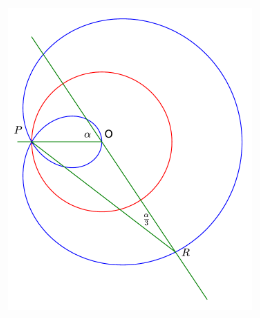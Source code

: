 \documentclass[11pt,a4paper]{article}
\begin{document}
\begin{figure}[htbp]
\begin{center}
\includegraphics[width=6.5cm,height=8cm]{limacon.pdf}
\end{center}
\end{figure}
\end{document}
